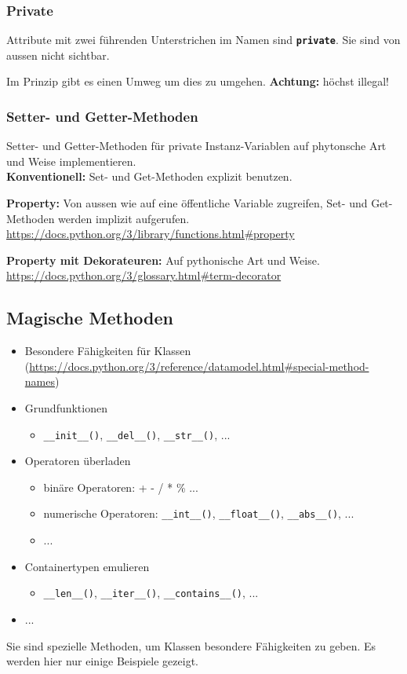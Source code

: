 \subsubsection{Private}
Attribute mit zwei führenden Unterstrichen im Namen sind \textbf{\texttt{private}}. Sie sind von aussen nicht sichtbar.

Im Prinzip gibt es einen Umweg um dies zu umgehen. \textbf{Achtung:} höchst illegal!


\subsubsection{Setter- und Getter-Methoden}
Setter- und Getter-Methoden für private Instanz-Variablen auf phytonsche Art und Weise implementieren.\\
\textbf{Konventionell:} Set- und Get-Methoden explizit benutzen.

\textbf{Property:} Von aussen wie auf eine öffentliche Variable zugreifen, Set- und Get-Methoden werden implizit aufgerufen.\\
\url{https://docs.python.org/3/library/functions.html#property}

\textbf{Property mit Dekorateuren:} Auf pythonische Art und Weise.\\
\url{https://docs.python.org/3/glossary.html#term-decorator}


\subsection{Magische Methoden}
\begin{itemize}
	\item Besondere Fähigkeiten für Klassen\\ (\url{https://docs.python.org/3/reference/datamodel.html#special-method-names})
	\item Grundfunktionen
	\begin{itemize}
		\item \texttt{\_\_init\_\_()}, \texttt{\_\_del\_\_()}, \texttt{\_\_str\_\_()}, ...
	\end{itemize}
	\item Operatoren überladen
	\begin{itemize}
		\item binäre Operatoren: + - / * \% ...
		\item numerische Operatoren: \texttt{\_\_int\_\_()}, \texttt{\_\_float\_\_()}, \texttt{\_\_abs\_\_()}, ...
		\item ...
	\end{itemize}
	\item Containertypen emulieren
	\begin{itemize}
		\item \texttt{\_\_len\_\_()}, \texttt{\_\_iter\_\_()}, \texttt{\_\_contains\_\_()}, ...
	\end{itemize}
	\item ...
\end{itemize}
Sie sind spezielle Methoden, um Klassen besondere Fähigkeiten zu geben. Es werden hier nur einige Beispiele gezeigt.

